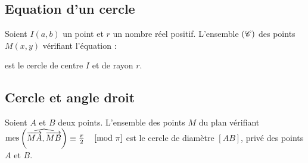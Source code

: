 		\subsection{Equation d'un cercle}
			Soient $I(a,b)$ un point et $r$ un nombre r\'eel positif.
				L'ensemble $(\mathscr{C})$ des points $M(x,y)$ v\'erifiant l'\'equation :
			\begin{center}
			\end{center}
			est le cercle de centre $I$ et de rayon $r$.
		\subsection{Cercle et angle droit}
			\begin{prop}
				Soient $A$ et $B$ deux points.
				L'ensemble des points $M$ du plan v\'erifiant $\mathrm{mes}\left( \widehat{ \overrightarrow{MA}, \overrightarrow{MB} } \right) \equiv \frac{\pi}{2} \quad \left[ \mathrm{mod}~\pi\right]$
				est le cercle de diam\`etre $[AB]$, priv\'e des points $A$ et $B$.
				

\end{prop}
